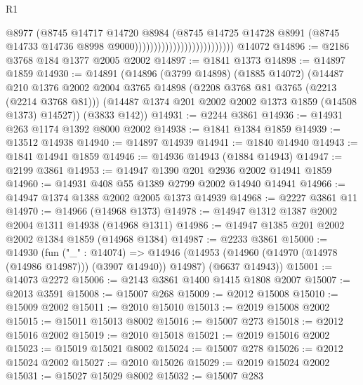 \begin{lexlean}{R1}
\begin{coremodule}
                                                  @8977
                                                  (@8745
                                                    @14717
                                                    @14720
                                                    @8984
                                                    (@8745
                                                      @14725
                                                      @14728
                                                      @8991
                                                      (@8745
                                                        @14733
                                                        @14736
                                                        @8998
                                                        @9000))))))))))))))))))))))))))
    @14072
@14896 := @2186 @3768 @184 @1377 @2005 @2002
@14897 := @1841 @1373
@14898 := @14897 @1859
@14930 := @14891
    (@14896
      (@3799 @14898)
      (@1885 @14072)
      (@14487
        @210
        @1376
        @2002
        @2004
        @3765
        @14898
        (@2208 @3768 @81 @3765 (@2213 (@2214 @3768 @81)))
        (@14487 @1374 @201 @2002 @2002 @1373 @1859 (@14508 @1373) @14527))
      (@3833 @142))
@14931 := @2244 @3861
@14936 := @14931 @263 @1174 @1392 @8000 @2002
@14938 := @1841 @1384 @1859
@14939 := @13512 @14938
@14940 := @14897 @14939
@14941 := @1840 @14940
@14943 := @1841 @14941 @1859
@14946 := @14936 @14943 (@1884 @14943)
@14947 := @2199 @3861
@14953 := @14947 @1390 @201 @2936 @2002 @14941 @1859
@14960 := @14931 @408 @55 @1389 @2799 @2002 @14940 @14941
@14966 := @14947 @1374 @1388 @2002 @2005 @1373 @14939
@14968 := @2227 @3861 @11
@14970 := @14966 (@14968 @1373)
@14978 := @14947 @1312 @1387 @2002 @2004 @1311 @14938 (@14968 @1311)
@14986 := @14947 @1385 @201 @2002 @2002 @1384 @1859 (@14968 @1384)
@14987 := @2233 @3861
@15000 := @14930
    (fun ("_" : @14074) =>
    @14946 (@14953 (@14960 (@14970 (@14978 (@14986 @14987))) (@3907 @14940)) @14987) (@6637 @14943))
@15001 := @14073 @2272
@15006 := @2143 @3861 @1400 @1415 @1808 @2007
@15007 := @2013 @3591
@15008 := @15007 @268
@15009 := @2012 @15008
@15010 := @15009 @2002
@15011 := @2010 @15010
@15013 := @2019 @15008 @2002
@15015 := @15011 @15013 @8002
@15016 := @15007 @273
@15018 := @2012 @15016 @2002
@15019 := @2010 @15018
@15021 := @2019 @15016 @2002
@15023 := @15019 @15021 @8002
@15024 := @15007 @278
@15026 := @2012 @15024 @2002
@15027 := @2010 @15026
@15029 := @2019 @15024 @2002
@15031 := @15027 @15029 @8002
@15032 := @15007 @283

\end{coremodule}
\end{lexlean}
